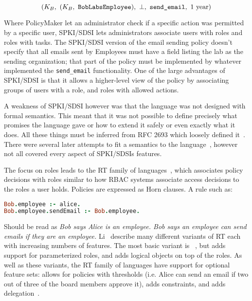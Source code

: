 \documentclass[thesis.tex]{subfiles}
\begin{document}
\begin{equation*}
 (K_B,~(K_B,~\text{\tt BobLabsEmployee}),~\bot,~\text{\ttfamily send\_email},~1~\text{year})
\end{equation*}

Where PolicyMaker let an administrator check if a specific action was
permitted by a specific user, SPKI/SDSI lets administrators associate
users with roles and roles with tasks.  The SPKI/SDSI version of the
email sending policy doesn't specify that all emails sent by Employees
must have a field listing the lab as the sending organization; that
part of the policy must be implemented by whatever implemented the
\texttt{send\_email} functionality.  One of the large advantages of
SPKI/SDSI is that it allows a higher-level view of the policy by
associating groups of users with a role, and roles with allowed
actions.

A weakness of SPKI/SDSI however was that the language was not designed
with formal semantics.  This meant that it was not possible to define
precisely what promises the language gave or how to extend it safely
or even exactly what it does.  All these things must be inferred from
RFC 2693 which loosely defined it~\cite{ellison_spki_1999}. There were
several later attempts to fit a semantics to the
language~\cite{joseph_y._halpern_logic_1999,abadi_sdsis_1998,howell_formal_2000},
however not all covered every aspect of SPKI/SDSIs features.

The focus on roles leads to the RT family of
languages~\cite{ninghui_li_design_2002}, which associates policy
decisions with roles similar to how \ac{RBAC} systems associate access
decisions to the roles a user holds.  Policies are expressed as Horn
clauses.  A rule such as:

\begin{lstlisting}[language=prolog]
Bob.employee :- alice.
Bob.employee.sendEmail :- Bob.employee.
\end{lstlisting}

Should be read as \emph{Bob says Alice is an employee.  Bob says an
employee can send emails if they are an employee.}  Li~\etal{}
describe many different variants of RT each with increasing numbers of
features.  The most basic variant is
~\cite{li_distributed_2003}, but  adds support for
parameterized roles, and  adds logical objects on top of the
roles.  As well as these variants, the RT family of languages have
support for optional feature sets:  allows for policies with
thresholds (i.e. Alice can send an email if two out of three of the
board members approve it),  adds constraints, and 
adds delegation~\cite{ninghui_li_design_2002}.
\end{document}

